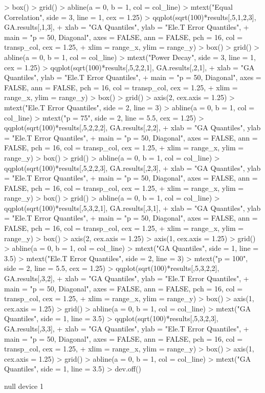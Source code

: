 \documentclass{article}
\begin{document}
\begin{Schunk}
\begin{Sinput}
> box()
> grid()
> abline(a = 0, b = 1, col = col_line)
> mtext("Equal Correlation", side = 3, line = 1, cex = 1.25)
> qqplot(sqrt(100)*results[,5,1,2,3], GA.results[,1,3],
+        xlab = "GA Quantiles", ylab = "Ele.T Error Quantiles",
+        main = "p = 50, Diagonal", axes = FALSE, ann = FALSE, pch = 16, col = transp_col, cex = 1.25,
+        xlim = range_x, ylim = range_y)
> box()
> grid()
> abline(a = 0, b = 1, col = col_line)
> mtext("Power Decay", side = 3, line = 1, cex = 1.25)
> qqplot(sqrt(100)*results[,5,2,2,1], GA.results[,2,1],
+        xlab = "GA Quantiles", ylab = "Ele.T Error Quantiles",
+        main = "p = 50, Diagonal", axes = FALSE, ann = FALSE, pch = 16, col = transp_col, cex = 1.25,
+        xlim = range_x, ylim = range_y)
> box()
> grid()
> axis(2, cex.axis = 1.25)
> mtext("Ele.T Error Quantiles", side = 2, line = 3)
> abline(a = 0, b = 1, col = col_line)
> mtext("p = 75", side = 2, line = 5.5, cex = 1.25)
> qqplot(sqrt(100)*results[,5,2,2,2], GA.results[,2,2],
+        xlab = "GA Quantiles", ylab = "Ele.T Error Quantiles",
+        main = "p = 50, Diagonal", axes = FALSE, ann = FALSE, pch = 16, col = transp_col, cex = 1.25,
+        xlim = range_x, ylim = range_y)
> box()
> grid()
> abline(a = 0, b = 1, col = col_line)
> qqplot(sqrt(100)*results[,5,2,2,3], GA.results[,2,3],
+        xlab = "GA Quantiles", ylab = "Ele.T Error Quantiles",
+        main = "p = 50, Diagonal", axes = FALSE, ann = FALSE, pch = 16, col = transp_col, cex = 1.25,
+        xlim = range_x, ylim = range_y)
> box()
> grid()
> abline(a = 0, b = 1, col = col_line)
> qqplot(sqrt(100)*results[,5,3,2,1], GA.results[,3,1],
+        xlab = "GA Quantiles", ylab = "Ele.T Error Quantiles",
+        main = "p = 50, Diagonal", axes = FALSE, ann = FALSE, pch = 16, col = transp_col, cex = 1.25,
+        xlim = range_x, ylim = range_y)
> box()
> axis(2, cex.axis = 1.25)
> axis(1, cex.axis = 1.25)
> grid()
> abline(a = 0, b = 1, col = col_line)
> mtext("GA Quantiles", side = 1, line = 3.5)
> mtext("Ele.T Error Quantiles", side = 2, line = 3)
> mtext("p = 100", side = 2, line = 5.5, cex = 1.25)
> qqplot(sqrt(100)*results[,5,3,2,2], GA.results[,3,2],
+        xlab = "GA Quantiles", ylab = "Ele.T Error Quantiles",
+        main = "p = 50, Diagonal", axes = FALSE, ann = FALSE, pch = 16, col = transp_col, cex = 1.25,
+        xlim = range_x, ylim = range_y)
> box()
> axis(1, cex.axis = 1.25)
> grid()
> abline(a = 0, b = 1, col = col_line)
> mtext("GA Quantiles", side = 1, line = 3.5)
> qqplot(sqrt(100)*results[,5,3,2,3], GA.results[,3,3],
+        xlab = "GA Quantiles", ylab = "Ele.T Error Quantiles",
+        main = "p = 50, Diagonal", axes = FALSE, ann = FALSE, pch = 16, col = transp_col, cex = 1.25,
+        xlim = range_x, ylim = range_y)
> box()
> axis(1, cex.axis = 1.25)
> grid()
> abline(a = 0, b = 1, col = col_line)
> mtext("GA Quantiles", side = 1, line = 3.5)
> dev.off()
\end{Sinput}
\begin{Soutput}
null device 
          1 
\end{Soutput}
\end{Schunk}

\begin{figure}

\end{figure}
\end{document}
